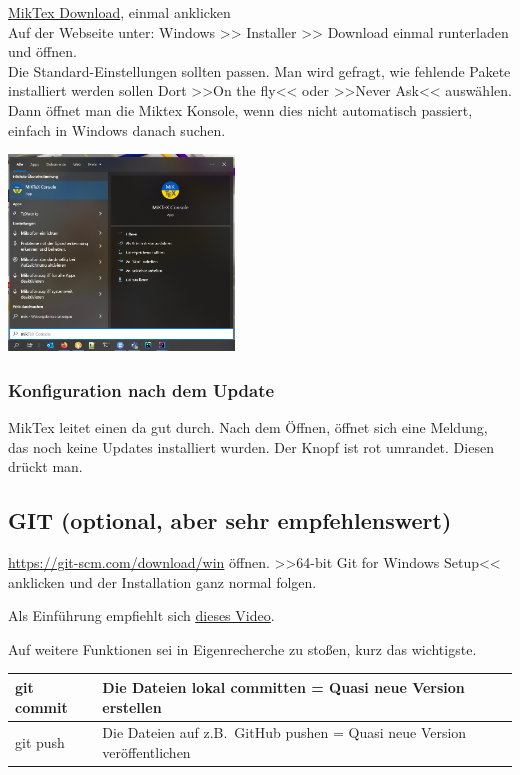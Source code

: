 \documentclass[11pt]{article}
\begin{document}
    \href{https://miktex.org/download}{MikTex Download}, einmal anklicken
    \\
    Auf der Webseite unter: Windows >> Installer >> Download einmal runterladen und öffnen.
    \\
    Die Standard-Einstellungen sollten passen.
    Man wird gefragt, wie fehlende Pakete installiert werden sollen Dort >>On the fly<< oder >>Never Ask<< auswählen.
    \\
    Dann öffnet man die Miktex Konsole, wenn dies nicht automatisch passiert, einfach in Windows danach suchen.
    \begin{center}
        \includegraphics[width=6cm]{resources/mik-tex}
    \end{center}

    \subsubsection{Konfiguration nach dem Update}

    MikTex leitet einen da gut durch.
    Nach dem Öffnen, öffnet sich eine Meldung, das noch keine Updates installiert wurden.
    Der Knopf ist rot umrandet.
    Diesen drückt man.

    \subsection{GIT (optional, aber sehr empfehlenswert)}\label{subsec:git}
    \href{https://git-scm.com/download/win}{https://git-scm.com/download/win} öffnen.
    >>64-bit Git for Windows Setup<< anklicken und der Installation ganz normal folgen.

    Als Einführung empfiehlt sich \href{https://www.youtube.com/watch?v=hwP7WQkmECE&ab_channel=Fireship}{\underline{dieses Video}}.

    Auf weitere Funktionen sei in Eigenrecherche zu stoßen, kurz das wichtigste.

    \begin{center}
        \begin{tabular}[h]{|l|l|}
            \hline
            git commit & Die Dateien lokal committen = Quasi neue Version erstellen               \\
            \hline
            git push   & Die Dateien auf z.B.\ GitHub pushen  = Quasi neue Version veröffentlichen \\
            \hline
        \end{tabular}
    \end{center}
\end{document}

